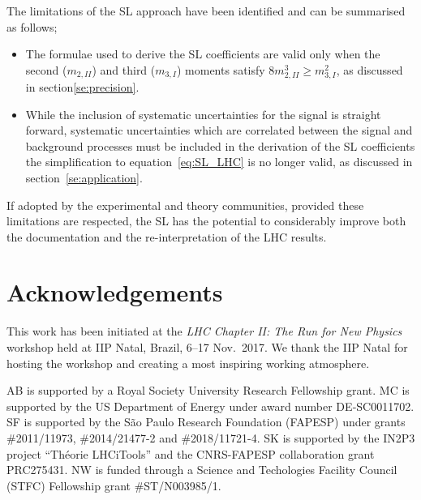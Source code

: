 \documentclass[11pt]{article}
\begin{document}

The limitations of the SL approach have been identified and can be summarised as follows; 
\begin{itemize}
\item{The formulae used to derive the SL coefficients are valid only when the second ($m_{2,II}$) and third ($m_{3,I}$) moments 
satisfy $8m^{3}_{2,II}\geq m^{2}_{3,I}$, as discussed in section\ref{se:precision}.}
\item{While the inclusion of systematic uncertainties for the signal is straight forward, 
systematic uncertainties which are correlated between the signal and background processes must be included in the derivation of the SL coefficients the simplification to equation~\ref{eq:SL_LHC} is no longer valid, as discussed in section~\ref{se:application}.}
\end{itemize}
If adopted by the experimental and theory communities, provided these limitations are respected, the SL has the potential to 
considerably improve both the documentation and the re-interpretation of the LHC results.





\section*{Acknowledgements}

This work has been initiated at the \textit{LHC Chapter II: The Run for New Physics} workshop held at IIP Natal, Brazil,  6--17 Nov.\ 2017. 
We thank the IIP Natal for hosting the workshop and creating a most inspiring working atmosphere.

AB is supported by a Royal Society University Research Fellowship grant. 
MC is supported by the US Department of Energy under award number DE‐SC0011702.
SF is supported by the S\~ao Paulo Research Foundation (FAPESP) under grants \#2011/11973, \#2014/21477-2 and  	
\#2018/11721-4. 
SK is supported by the IN2P3 project ``Th\'eorie LHCiTools'' and the CNRS-FAPESP collaboration grant PRC275431. 
NW is funded through a Science and Techologies Facility Council (STFC) Fellowship grant \#ST/N003985/1.
\end{document}
